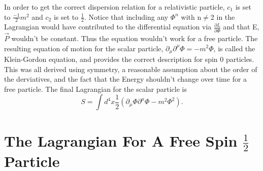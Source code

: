 In order to get the correct dispersion relation for a relativistic particle, $c_1$ is set to $\frac{-1}{2}m^2$ and $c_2$ is set to $\frac{1}{2}$. Notice that including any $\Phi^n$ with n$\neq$2 in the Lagrangian would have contributed to the differential equation via $\frac{\partial L}{\partial \Phi}$ and that E, $\vec{P}$ wouldn't be constant. Thus the equation wouldn't work for a free particle. The resulting equation of motion for the scalar particle, $\partial_\mu\partial^\mu\Phi = -m^2\Phi$, is called the Klein-Gordon equation, and provides the correct description for spin 0 particles. This was all derived using symmetry, a reasonable assumption about the order of the derviatives, and the fact that the Energy shouldn't change over time for a free particle. The final Lagrangian for the scalar particle is 
\begin{equation}
S = \int d^4x \frac{1}{2}\left(\partial_\mu\Phi\partial^\mu\Phi - m^2 \Phi^2 \right).
\end{equation}

\section{The Lagrangian For A Free Spin $\frac{1}{2}$ Particle}

